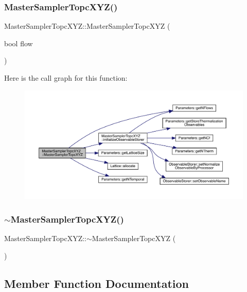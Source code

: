 \subsubsection{\texorpdfstring{MasterSamplerTopcXYZ()}{MasterSamplerTopcXYZ()}}
{\footnotesize\ttfamily Master\+Sampler\+Topc\+X\+Y\+Z\+::\+Master\+Sampler\+Topc\+X\+YZ (\begin{DoxyParamCaption}\item[{bool}]{flow }\end{DoxyParamCaption})}

Here is the call graph for this function\+:\nopagebreak
\begin{figure}[H]
\begin{center}
\leavevmode
\includegraphics[width=350pt]{class_master_sampler_topc_x_y_z_ad8ba8f2c50c66d823c551f71fd62a99b_cgraph}
\end{center}
\end{figure}
\mbox{\label{class_master_sampler_topc_x_y_z_a7e896952c909a1f29f97e0ef4c52d348}} 
\subsubsection{\texorpdfstring{$\sim$MasterSamplerTopcXYZ()}{~MasterSamplerTopcXYZ()}}
{\footnotesize\ttfamily Master\+Sampler\+Topc\+X\+Y\+Z\+::$\sim$\+Master\+Sampler\+Topc\+X\+YZ (\begin{DoxyParamCaption}{ }\end{DoxyParamCaption})}



\subsection{Member Function Documentation}
\mbox{\label{class_master_sampler_topc_x_y_z_a0ea80ad9935db791f00461b7dfd548b7}} 
